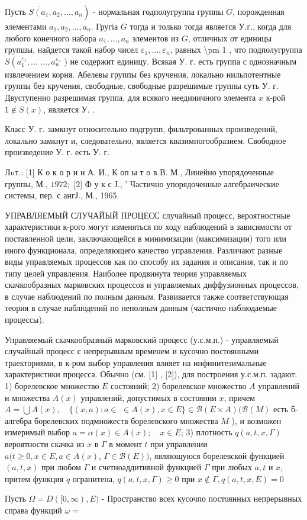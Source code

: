 \documentclass[10pt]{article}
\begin{document}
Пусть $\left.\overline{S\left(a_{1}\right.}, a_{2}, \ldots, a_{n}\right)$ - нормальная годполугруппа группы $G$, порожденная элементами $a_{1}, a_{2}, \ldots, a_{n}$. Гругіа $G$ тогда и только тогда является У.г., когда для любого конечного набора $a_{1}, \ldots, a_{n}$ элементов из $G$, отличных от единицы групшы, найдется такой набор чисел $\varepsilon_{1}, \ldots, \varepsilon_{n}$, равных \textbackslash pm 1 , что подполугруппа $S\left(a_{1}^{\varepsilon_{1}}, \ldots\right.$ $\ldots, a_{n}^{\varepsilon_{n}}$ ) не содержит единицу. Всякая У. г. есть группа с однозначным извлечением корня. Абелевы группы без кручения, локально нильпотентные группы без кручения, свободные, свободные разрешимые группы суть У. г. Двуступенно разрешимая группа, для всякого неединичного элемента $x$ к-рой $1 \notin S(x)$, является У. .



Класс У. г. замкнут относительно подгрупп, фильтрованных произведений, локально замкнут и, следовательно, является квазимногообразием. Свободное произведение У. г. есть У. г.



Лuт.: [1] К о к о р и н А. И., К оп ы т о в В. М., Линейно упорядоченные группы, М., $1972 ;$ [2] Ф у к с Ј., ' Частично упорядоченные алгебраические системы, пер. с ангЈ., М., 1965.



УПРАВЛЯЕМЫЙ СЛУЧАЙЫЙ ПРОЦЕСС случайный процесс, вероятностные характеристики к-рого могут изменяться по ходу наблюдений в зависимости от поставленной цели, заключающейся в минимизации (максимизации) того или иного функционала, определяющего качество управления. Различают разные виды управляемых процессов как по способу их задания и описания, так и по типу целей управления. Наиболее продвинута теория управляемых скачкообразных марковских процессов и управляемых диффузионных процессов, в случае наблюдений по полным данным. Развивается также соответствующая теория в случае наблюдений по неполным данным (частично наблюдаемые процессы).



Управляемый скачкообразный марковский процесс (у.с.м.п.) - управляемый случайный процесс с непрерывным временем и кусочно постоянными траекториями, в к-ром выбор управления влияет на инфинитезимальные характеристики процесса. Обычно (см. [1] , [2]), для построения у.с.м.п. задают: 1) борелевское множество $E$ состояний; 2) борелевское множество $A$ управлений и множества $A(x)$ управлений, допустимых в состоянии $x$, причем $A=\bigcup A(x), \quad\{(x, a): a \in$ $\in A(x), x \in E\} \in \mathscr{B}(E \times A)(\mathscr{B}(M)$ есть б-алгебра борелевских подмножеств борелевского множества $M$ ), и возможен измеримый выбор $a=\alpha(x) \in A(x) ; \quad x \in E$; 3) плотность $q(a, t, x, \Gamma)$ вероятности скачка из $x$ в $\Gamma$ в момент $t$ при управлении $a(t \geqslant 0, x \in E, a \in A(x)$, $\Gamma \in \mathscr{B}(E))$, являющуюся борелевской функцией $(a, t, x)$ при любом $\Gamma$ и счетноаддитивной функцией $\Gamma$ при любых $a, t$ и $x$, притем функция $q$ огранитена, $q(a, t, x, \Gamma) \geqslant 0$ при $x \notin \Gamma, q(a, t, x, E)=0$



Пусть $\Omega=D([0, \infty), E)$ - Пространство всех кусочпо постоянных непрерывных справа функций $\omega=$
\end{document}
